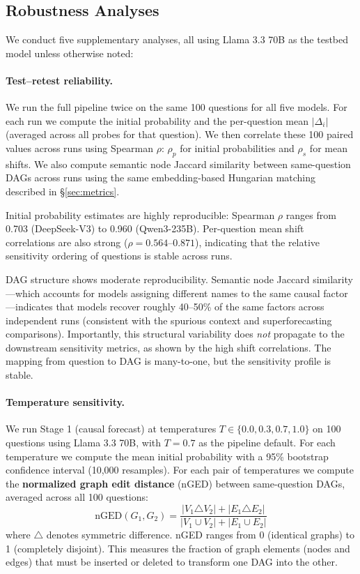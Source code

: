 \documentclass[11pt]{article}
\begin{document}
\subsection{Robustness Analyses}

We conduct five supplementary analyses, all using Llama 3.3 70B as the testbed model unless otherwise noted:

\paragraph{Test--retest reliability.} We run the full pipeline twice on the same 100 questions for all five models. For each run we compute the initial probability and the per-question mean $|\Delta_i|$ (averaged across all probes for that question). We then correlate these 100 paired values across runs using Spearman $\rho$: $\rho_p$ for initial probabilities and $\rho_s$ for mean shifts. We also compute semantic node Jaccard similarity between same-question DAGs across runs using the same embedding-based Hungarian matching described in \S\ref{sec:metrics}.

Initial probability estimates are highly reproducible: Spearman $\rho$ ranges from 0.703 (DeepSeek-V3) to 0.960 (Qwen3-235B). Per-question mean shift correlations are also strong ($\rho = 0.564$--$0.871$), indicating that the relative sensitivity ordering of questions is stable across runs.

DAG structure shows moderate reproducibility. Semantic node Jaccard similarity---which accounts for models assigning different names to the same causal factor---indicates that models recover roughly 40--50\% of the same factors across independent runs (consistent with the spurious context and superforecasting comparisons). Importantly, this structural variability does \emph{not} propagate to the downstream sensitivity metrics, as shown by the high shift correlations. The mapping from question to DAG is many-to-one, but the sensitivity profile is stable.

\paragraph{Temperature sensitivity.} We run Stage 1 (causal forecast) at temperatures $T \in \{0.0, 0.3, 0.7, 1.0\}$ on 100 questions using Llama 3.3 70B, with $T = 0.7$ as the pipeline default. For each temperature we compute the mean initial probability with a 95\% bootstrap confidence interval (10,000 resamples). For each pair of temperatures we compute the \textbf{normalized graph edit distance} (nGED) between same-question DAGs, averaged across all 100 questions:
\begin{equation}
    \text{nGED}(G_1, G_2) = \frac{|V_1 \triangle V_2| + |E_1 \triangle E_2|}{|V_1 \cup V_2| + |E_1 \cup E_2|}
\end{equation}
where $\triangle$ denotes symmetric difference. nGED ranges from 0 (identical graphs) to 1 (completely disjoint). This measures the fraction of graph elements (nodes and edges) that must be inserted or deleted to transform one DAG into the other.
\end{document}
